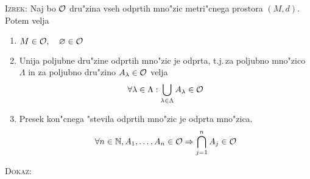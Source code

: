 \textsc{Izrek:} Naj bo $\operatorname{\mathcal{O}}$ dru"zina vseh odprtih mno"zic metri"cnega prostora $(M, d)$. Potem velja
\begin{enumerate}[(1)]
    \item $M \in \operatorname{\mathcal{O}}, \quad \varnothing \in \operatorname{\mathcal{O}}$
    
    \item Unija poljubne dru"zine odprtih mno"zic je odprta, t.j.\,za poljubno mno"zico $\Lambda$ in za poljubno dru"zino $A_\lambda \in \operatorname{\mathcal{O}}$ velja
    \begin{equation*}
    \forall \lambda \in \Lambda: \bigcup_{\lambda \in \Lambda} A_\lambda \in \operatorname{\mathcal{O}}
    \end{equation*}
    
    \item Presek kon"cnega "stevila odprtih mno"zic je odprta mno"zica.
    \begin{equation*}
    \forall n \in \mathbb{N}, A_1, \ldots, A_n \in \operatorname{\mathcal{O}} \Rightarrow \bigcap_{j = 1}^n A_j \in \operatorname{\mathcal{O}}
    \end{equation*}
\end{enumerate}
\textsc{Dokaz:}
